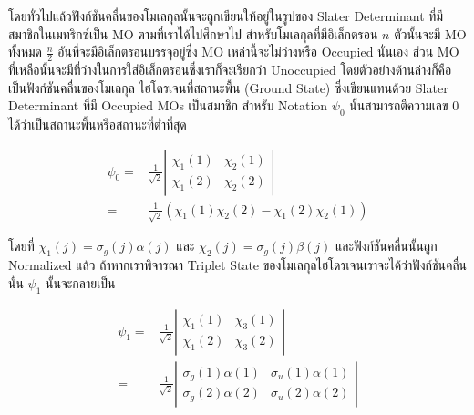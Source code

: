 โดยทั่วไปแล้วฟังก์ชันคลื่นของโมเลกุลนั้นจะถูกเขียนให้อยู่ในรูปของ Slater Determinant ที่มีสมาชิกในเมทริกซ์เป็น MO ตามที่เราได้ไปศึกษาไป
สำหรับโมเลกุลที่มีอิเล็กตรอน $n$ ตัวนั้นจะมี MO ทั้งหมด $\frac{n}{2}$ อันที่จะมีอิเล็กตรอนบรรจุอยู่ซึ่ง MO เหล่านี้จะไม่ว่างหรือ Occupied
นั่นเอง ส่วน MO ที่เหลือนั้นจะมีที่ว่างในการใส่อิเล็กตรอนซึ่งเราก็จะเรียกว่า Unoccupied โดยตัวอย่างด้านล่างก็คือเป็นฟังก์ชันคลื่นของโมเลกุล%
ไฮโดรเจนที่สถานะพื้น (Ground State) ซึ่งเขียนแทนด้วย Slater Determinant ที่มี Occupied MOs เป็นสมาชิก สำหรับ Notation
$\psi_0$ นั้นสามารถตีความเลข 0 ได้ว่าเป็นสถานะพื้นหรือสถานะที่ต่ำที่สุด

\begin{equation}
    \begin{aligned}
        \psi_0
        = &
        \frac{1}{\sqrt{2}}
        \left|
        \begin{array}{ll}
            \chi_1(1) & \chi_2(1) \\
            \chi_1(2) & \chi_2(2)
        \end{array}
        \right| \\
        = &
        \frac{1}{\sqrt{2}}
        \left(
        \chi_1(1) \chi_2(2) - \chi_1(2) \chi_2(1)
        \right)
    \end{aligned}
\end{equation}

\noindent โดยที่ $\chi_1(j) = \sigma_g(j) \alpha(j)$ และ $\chi_2(j) = \sigma_g(j) \beta(j)$ และฟังก์ชันคลื่นนั้นถูก
Normalized แล้ว ถ้าหากเราพิจารณา Triplet State ของโมเลกุลไฮโดรเจนเราจะได้ว่าฟังก์ชันคลื่นนั้น $\psi_1$ นั้นจะกลายเป็น

\begin{equation}
    \begin{aligned}
        \psi_1
        = &
        \frac{1}{\sqrt{2}}
        \left|
        \begin{array}{ll}
            \chi_1(1) & \chi_3(1) \\
            \chi_1(2) & \chi_3(2)
        \end{array}
        \right|                \\
        = & \frac{1}{\sqrt{2}}
        \left|
        \begin{array}{ll}
            \sigma_g(1) \alpha(1) & \sigma_u(1) \alpha(1) \\
            \sigma_g(2) \alpha(2) & \sigma_u(2) \alpha(2)
        \end{array}
        \right|
    \end{aligned}
\end{equation}

